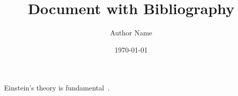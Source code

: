 \documentclass{article}
\title{Document with Bibliography}
\author{Author Name}
\date{\today}
\begin{document}
\maketitle

Einstein’s theory is fundamental~\cite{einstein}.



\end{document}
